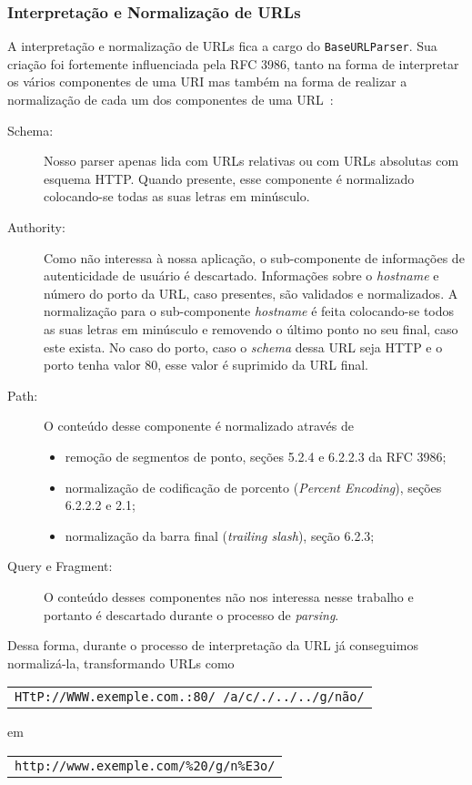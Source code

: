 \documentclass[10pt,twocolumn]{article}
\begin{document}
\subsubsection{Interpretação e Normalização de URLs}

A interpretação e normalização de URLs fica a cargo do
\texttt{BaseURLParser}. Sua criação foi fortemente influenciada pela RFC
3986, tanto na forma de interpretar os vários componentes de uma URI mas
também na forma de realizar a normalização de cada um dos componentes de
uma URL~\cite{rfc3986}:

\begin{description}
\item[Schema:] Nosso parser apenas lida com URLs relativas ou com URLs
absolutas com esquema HTTP. Quando presente, esse componente é
normalizado colocando-se todas as suas letras em minúsculo.

\item[Authority:] Como não interessa à nossa aplicação, o sub-componente de
informações de autenticidade de usuário é descartado. Informações sobre
o \emph{hostname} e número do porto da URL, caso presentes, são
validados e normalizados. A normalização para o sub-componente
\emph{hostname} é feita colocando-se todos as suas letras em minúsculo e
removendo o último ponto no seu final, caso este exista. No caso do
porto, caso o \emph{schema} dessa URL seja HTTP e o porto tenha valor
80, esse valor é suprimido da URL final.

\item[Path:] O conteúdo desse componente é normalizado através de
    \begin{itemize}
    \item  remoção de segmentos de ponto, seções 5.2.4 e 6.2.2.3 da RFC 3986;
    \item  normalização de codificação de porcento (\emph{Percent Encoding}), 
           seções 6.2.2.2 e 2.1;
    \item  normalização da barra final (\emph{trailing slash}), seção
           6.2.3;
    \end{itemize}

\item[Query e Fragment:] O conteúdo desses componentes não nos interessa
nesse trabalho e portanto é descartado durante o processo de
\emph{parsing}.

\end{description}

Dessa forma, durante o processo de interpretação da URL já conseguimos
normalizá-la, transformando URLs como
\begin{tabular}{c}
\texttt{\small HTtP://WWW.exemple.com.:80/ /a/c/./../../g/não/}
\end{tabular}
em
\begin{tabular}{c}
\texttt{\small http://www.exemple.com/\%20/g/n\%E3o/}
\end{tabular}
\end{document}
